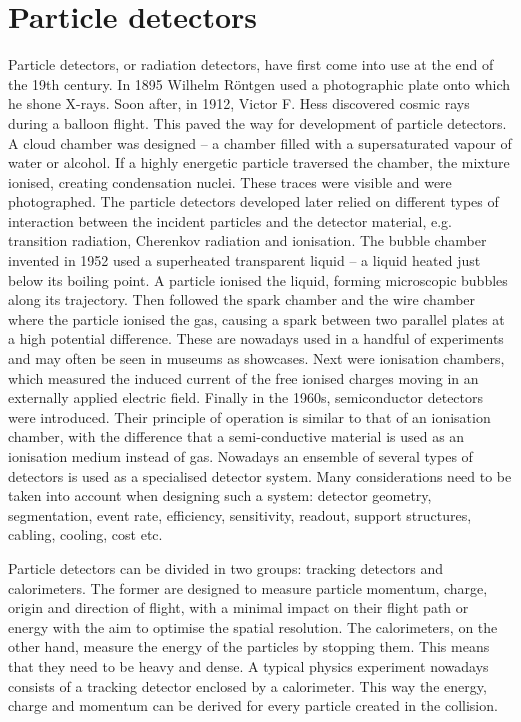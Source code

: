 \section{Particle detectors}
Particle detectors, or radiation detectors, have first come into use at the end of the 19th century. In 1895 Wilhelm R\"ontgen used a photographic plate onto which he shone X-rays. Soon after, in 1912, Victor F. Hess discovered cosmic rays during a balloon flight. This paved the way for development of particle detectors. A cloud chamber was designed -- a chamber filled with a supersaturated vapour of water or alcohol. If a highly energetic particle traversed the chamber, the mixture ionised, creating condensation nuclei. These traces were visible and were photographed. The particle detectors developed later relied on different types of interaction between the incident particles and the detector material, e.g. transition radiation, Cherenkov radiation and ionisation. The bubble chamber invented in 1952 used a superheated transparent liquid -- a liquid heated just below its boiling point. A particle ionised the liquid, forming microscopic bubbles along its trajectory. Then followed the spark chamber and the wire chamber where the particle ionised the gas, causing a spark between two parallel plates at a high potential difference. These are nowadays used in a handful of experiments and may often be seen in museums as showcases. Next were ionisation chambers, which measured the induced current of the free ionised charges moving in an externally applied electric field. Finally in the 1960s, semiconductor detectors were introduced. Their principle of operation is similar to that of an ionisation chamber, with the difference that a semi-conductive material is used as an ionisation medium instead of gas. Nowadays an ensemble of several types of detectors is used as a specialised detector system. Many considerations need to be taken into account when designing such a system: detector geometry, segmentation, event rate, efficiency, sensitivity, readout, support structures, cabling, cooling, cost etc.

Particle detectors can be divided in two groups: tracking detectors and calorimeters. The former are designed to measure  particle momentum, charge, origin and direction of flight, with a minimal impact on their flight path or energy with the aim to optimise the spatial resolution. The calorimeters, on the other hand, measure the energy of the particles by stopping them. This means that they need to be heavy and dense. A typical physics experiment nowadays consists of a tracking detector enclosed by a calorimeter. This way the energy, charge and momentum can be derived for every particle created in the collision.





